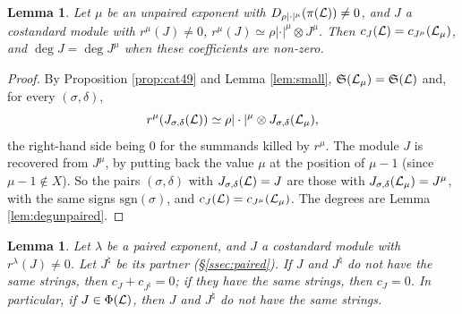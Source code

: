 \documentclass[a4paper,12pt,leqno]{amsart}
\theoremstyle{plain}
\newtheorem{lemma}[thm]{Lemma}
\theoremstyle{definition}
\providecommand{\frS}{\mathfrak{S}}\providecommand{\frs}{\mathfrak{s}}
\begin{document}
\begin{lemma}\label{lem:coefunpaired} Let $\mu$ be an unpaired exponent with
$D_{\rho|\cdot|^\mu}(\pi(\mathcal{L}))\neq0$, and $J$ a costandard module with $r^\mu(J)\neq0$,
$r^\mu(J)\simeq\rho|\cdot|^\mu\otimes J^\mu$. Then $c_J(\mathcal{L})=c_{J^\mu}(\mathcal{L}_\mu)$, and $\deg J=\deg J^\mu$ when
these coefficients are non-zero.
\end{lemma}

\begin{proof}
By Proposition \ref{prop:cat49} and Lemma \ref{lem:small}, $\frS(\caL_\mu)=\frS(\caL)$
and, for every $(\sigma,\delta)$,
\[r^\mu(J_{\sigma,\delta}(\mathcal{L}))\simeq\rho|\cdot|^\mu\otimes J_{\sigma,\delta}(\mathcal{L}_\mu),\]
the right-hand side being $0$ for the summands killed by $r^\mu$. The module $J$ is recovered
from $J^\mu$, by putting back the value $\mu$ at the position of $\mu-1$ (since $\mu-1\notin X$). So the pairs
$(\sigma,\delta)$ with $J_{\sigma,\delta}(\mathcal{L})=J$ are those with $J_{\sigma,\delta}(\mathcal{L}_\mu)=J^\mu$, with
the same signs $\mathrm{sgn}(\sigma)$, and $c_J(\mathcal{L})=c_{J^\mu}(\mathcal{L}_\mu)$. The degrees are Lemma
\ref{lem:degunpaired}.
\end{proof}

\begin{lemma}\label{lem:coefpaired} Let $\lambda$ be a paired exponent, and $J$ a costandard module with
$r^\lambda(J)\neq0$. Let $J^\natural$ be its partner (\S\ref{ssec:paired}). If $J$ and $J^\natural$ do not have the same
strings, then $c_J+c_{J^\natural}=0$; if they have the same strings, then $c_J=0$. In particular, if
$J\in\Phi(\mathcal{L})$, then $J$ and $J^\natural$ do not have the same strings.
\end{lemma}
\end{document}
